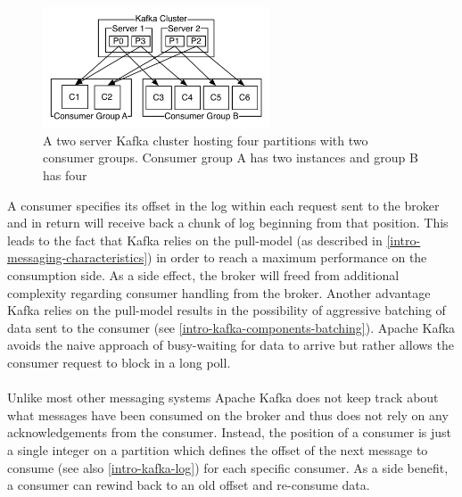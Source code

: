 \begin{figure}[H]
    \centering
    \includegraphics[width=0.6\textwidth]{images/consumer-groups.png}
    \caption{A two server Kafka cluster hosting four partitions with two consumer groups. Consumer group A has two instances and group B has four \cite{apachekafka}}
    \label{fig:the-log}
\end{figure}

A consumer specifies its offset in the log within each request sent to the
broker and in return will receive back a chunk of log beginning from that
position. This leads to the fact that Kafka relies on the pull-model (as
described in \ref{intro-messaging-characteristics}) in order to reach a maximum
performance on the consumption side. As a side effect, the broker will freed
from additional complexity regarding consumer handling from the broker. Another
advantage Kafka relies on the pull-model results in the possibility of
aggressive batching of data sent to the consumer (see
\ref{intro-kafka-components-batching}). Apache Kafka avoids the naive approach
of busy-waiting for data to arrive but rather allows the consumer request to
block in a \gls{long poll}. \cite{apachekafka}
\\ \\
Unlike most other messaging systems Apache Kafka does not keep track about what
messages have been consumed on the broker and thus does not rely on any
acknowledgements from the consumer. Instead, the position of a consumer is just
a single integer on a partition which defines the offset of the next message to
consume (see also \ref{intro-kafka-log}) for each specific consumer. As a side
benefit, a consumer can rewind back to an old offset and re-consume data.
\cite{apachekafka}


